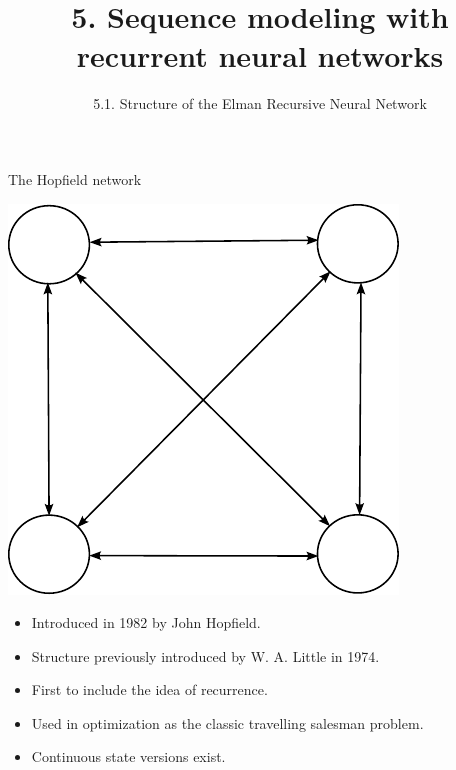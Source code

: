 \documentclass{beamer}
\title[5. Recurrent neural networks]{5. Sequence modeling with recurrent neural networks}
\subtitle{5.1. Structure of the Elman Recursive Neural Network}
\begin{document}
\maketitle
\begin{frame}{The Hopfield network}
\begin{multicols}{2}
\begin{center}
    \includegraphics[scale=0.8]{Module 5 (RNN)/pics/hopfield.pdf}
\end{center}

\columnbreak

\begin{itemize}
    \item Introduced in 1982 by John Hopfield. 
    \item Structure previously introduced by W. A. Little in 1974.
    \item First to include the idea of recurrence. 
    \item Used in optimization as the classic travelling salesman problem. 
    \item Continuous state versions exist.
\end{itemize}

\end{multicols}

\end{frame}
\end{document}
